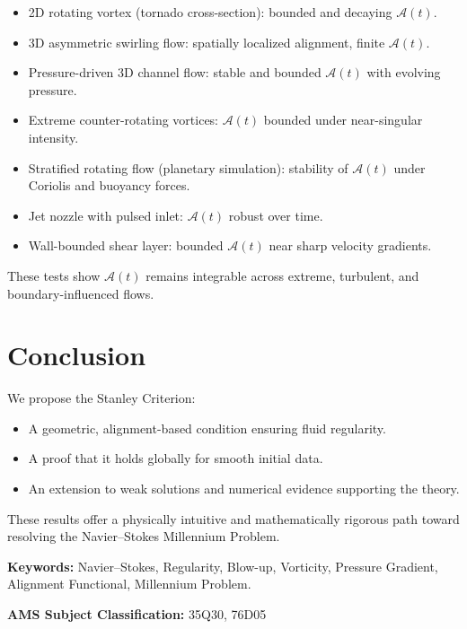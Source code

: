 \documentclass[11pt]{article}
\begin{document}
\begin{itemize}
  \item 2D rotating vortex (tornado cross-section): bounded and decaying $\mathcal{A}(t)$.
  \item 3D asymmetric swirling flow: spatially localized alignment, finite $\mathcal{A}(t)$.
  \item Pressure-driven 3D channel flow: stable and bounded $\mathcal{A}(t)$ with evolving pressure.
  \item Extreme counter-rotating vortices: $\mathcal{A}(t)$ bounded under near-singular intensity.
  \item Stratified rotating flow (planetary simulation): stability of $\mathcal{A}(t)$ under Coriolis and buoyancy forces.
  \item Jet nozzle with pulsed inlet: $\mathcal{A}(t)$ robust over time.
  \item Wall-bounded shear layer: bounded $\mathcal{A}(t)$ near sharp velocity gradients.
\end{itemize}

These tests show $\mathcal{A}(t)$ remains integrable across extreme, turbulent, and boundary-influenced flows.

\section{Conclusion}

We propose the Stanley Criterion:
\begin{itemize}
  \item A geometric, alignment-based condition ensuring fluid regularity.
  \item A proof that it holds globally for smooth initial data.
  \item An extension to weak solutions and numerical evidence supporting the theory.
\end{itemize}

These results offer a physically intuitive and mathematically rigorous path toward resolving the Navier--Stokes Millennium Problem.

\bigskip
\noindent\textbf{Keywords:} Navier--Stokes, Regularity, Blow-up, Vorticity, Pressure Gradient, Alignment Functional, Millennium Problem.

\noindent\textbf{AMS Subject Classification:} 35Q30, 76D05
\end{document}
